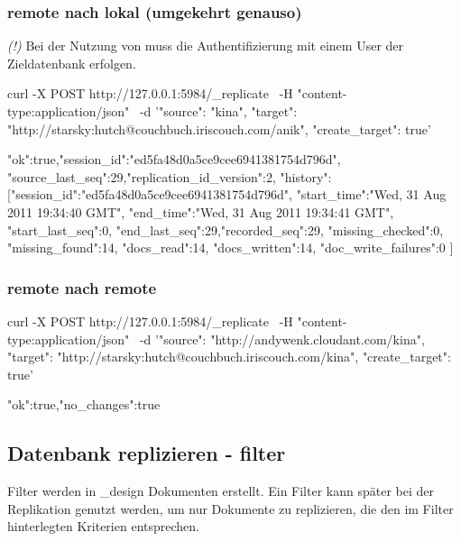 \documentclass[19pt,landscape,twocolumn]{article}
\newcommand{\mono}[1]{\texttt{\textendash\textendash {#1}}}
\newcommand{\setparskip}{\setlength{\parskip}{-6mm}}
\newcommand{\resetparskip}{\setlength{\parskip}{1mm}}
\begin{document}
\subsubsection{remote nach lokal (umgekehrt genauso)}
\emph{(!)} Bei der Nutzung von \mono{create\_target} muss die Authentifizierung mit einem
User der Zieldatenbank erfolgen.

\begin{code}
curl -X POST http://127.0.0.1:5984/_replicate \
     -H "content-type:application/json" \
     -d '{"source": "kina",
          "target": "http://starsky:hutch@couchbuch.iriscouch.com/anik",
          "create_target": true}'
\end{code}
\setparskip
\begin{response}
{"ok":true,"session_id":"ed5fa48d0a5ce9cee6941381754d796d",
  "source_last_seq":29,"replication_id_version":2,
  "history":
    [{"session_id":"ed5fa48d0a5ce9cee6941381754d796d",
      "start_time":"Wed, 31 Aug 2011 19:34:40 GMT",
      "end_time":"Wed, 31 Aug 2011 19:34:41 GMT",
      "start_last_seq":0,
      "end_last_seq":29,"recorded_seq":29,
      "missing_checked":0,
      "missing_found":14,
      "docs_read":14,
      "docs_written":14,
      "doc_write_failures":0
  }]
}
\end{response}
\resetparskip

\subsubsection{remote nach remote}
\begin{code}
curl -X POST http://127.0.0.1:5984/_replicate \
     -H "content-type:application/json" \
     -d '{"source": "http://andywenk.cloudant.com/kina",
          "target": "http://starsky:hutch@couchbuch.iriscouch.com/kina",
          "create_target": true}'
\end{code}
\setparskip
\begin{response}
{"ok":true,"no_changes":true}
\end{response}
\resetparskip

\subsection{Datenbank replizieren - filter}

Filter werden in \_design Dokumenten erstellt. Ein Filter kann später bei der Replikation genutzt werden, um nur
Dokumente zu replizieren, die den im Filter hinterlegten Kriterien entsprechen.
\end{document}
